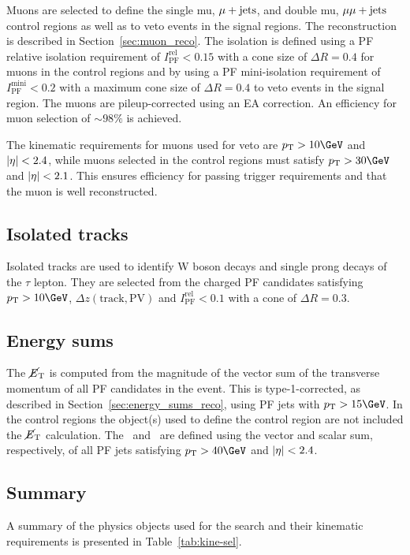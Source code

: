 Muons are selected to define the single mu, $\mu + \textrm{jets}$, and double mu, $\mu\mu + \textrm{jets}$ control regions as well as 
to veto events in the signal regions. The reconstruction is described in Section~\ref{sec:muon_reco}.
The isolation is defined using a PF relative isolation requirement of $I_{\text{PF}}^{\text{rel}} < 0.15$ 
with a cone size of $\Delta R = 0.4$ for muons in the control regions and by using a PF mini-isolation requirement of
$I_{\text{PF}}^{\text{mini}} < 0.2$ with a maximum cone size of $\Delta R = 0.4$ to veto events in the signal region. The muons are pileup-corrected
using an EA correction. An efficiency for muon selection of $\sim98\%$ is achieved.

The kinematic requirements for muons used for veto are $\pt > 10\GeV$ and $|\eta| < 2.4$, while muons 
selected in the control regions must satisfy $\pt > 30\GeV$ and $|\eta| < 2.1$. This ensures efficiency
for passing trigger requirements and that the muon is well reconstructed.


\subsection{Isolated tracks}

Isolated tracks are used to identify W boson decays and single prong decays of the $\tau$ lepton. 
They are selected from the charged PF candidates satisfying $\pt > 10\GeV$, $\Delta z(\text{track},\text{PV})$ and 
$I_{\text{PF}}^{\text{rel}} < 0.1$ with a cone of $\Delta R = 0.3$.

\subsection{Energy sums}

The $\mbox{$\cancel{E}_\text{T}$}$ is computed from the magnitude of the vector sum of the transverse momentum of all PF candidates in
the event. This is type-1-corrected, as described in Section~\ref{sec:energy_sums_reco}, 
using PF jets with $\pt > 15\GeV$. In the control regions the object(s) used to define
the control region are not included the $\mbox{$\cancel{E}_\text{T}$}$ calculation. The \mht~and \scalht~are defined
using the vector and scalar sum, respectively, of all PF jets satisfying $\pt > 40 \GeV$ and $|\eta| < 2.4$.

\subsection{Summary}

A summary of the physics objects used for the \alphat search and their
kinematic requirements is presented in Table~\ref{tab:kine-sel}.

